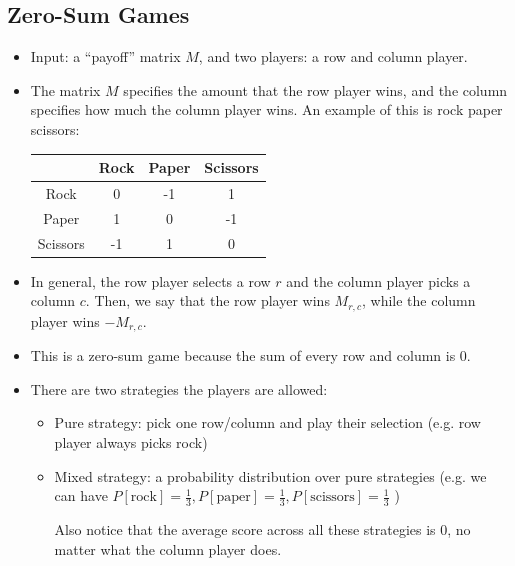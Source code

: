 \subsection{Zero-Sum Games}
\begin{itemize}
	\item Input: a ``payoff'' matrix \(M\), and two players: a row and column player. 
	\item The matrix \(M\) specifies the amount that the row player wins, and the column specifies how much 
		the column player wins. An example of this is rock paper scissors:
		\begin{center}
			\begin{tabular}{c|c|c|c}
				& Rock & Paper & Scissors\\
				\hline
				Rock & 0 & -1 & 1\\
				\hline 
				Paper & 1 & 0 & -1\\
				\hline
				Scissors & -1 & 1 & 0
			\end{tabular}
		\end{center}
	\item In general, the row player selects a row \(r\) and the column player picks a column \(c\). Then, 
		we say that the row player wins \(M_{r, c}\), while the column player wins \(-M_{r, c}\).
	\item This is a zero-sum game because the sum of every row and column is 0. 
	\item There are two strategies the players are allowed: 
		\begin{itemize}
			\item Pure strategy: pick one row/column and play their selection (e.g. row player always picks rock)
			\item Mixed strategy: a probability distribution over pure strategies (e.g. we can have
				\(P[\text{rock}] = 
				\frac{1}{3}, P[\text{paper}] = \frac{1}{3}, P[\text{scissors}] = \frac{1}{3}\) ) 

				Also notice that the average score across all these strategies is 0, no matter what the column
				player does.
		\end{itemize}
\end{itemize}
